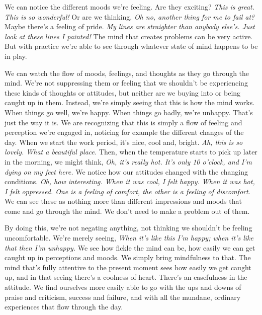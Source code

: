 We can notice the different moods we're feeling. Are they exciting? 
\emph{This is great. This is so wonderful!} Or are we thinking, 
\emph{Oh no, another thing for me to fail at?} Maybe there's a feeling 
of pride. \emph{My lines are straighter than anybody else's. Just look 
at these lines I painted!} The mind that creates problems can be very 
active. But with practice we're able to see through whatever state of 
mind happens to be in play.

We can watch the flow of moods, feelings, and thoughts as they go 
through the mind. We're not suppressing them or feeling that we 
shouldn't be experiencing these kinds of thoughts or attitudes, but 
neither are we buying into or being caught up in them. Instead, we're 
simply seeing that this is how the mind works. When things go well, 
we're happy. When things go badly, we're unhappy. That's just the way 
it is. We are recognizing that this is simply a flow of feeling and 
perception we're engaged in, noticing for example the different changes 
of the day. When we start the work period, it's nice, cool and, bright. 
\emph{Ah, this is so lovely. What a beautiful place.} Then, when the 
temperature starts to pick up later in the morning, we might think, 
\emph{Oh, it's really hot. It's only 10 o'clock, and I'm dying on my 
feet here.} We notice how our attitudes changed with the changing 
conditions. \emph{Oh, how interesting. When it was cool, I felt happy. 
When it was hot, I felt oppressed. One is a feeling of comfort, the 
other is a feeling of discomfort.} We can see these as nothing more 
than different impressions and moods that come and go through the mind. 
We don't need to make a problem out of them.

By doing this, we're not negating anything, not thinking we shouldn't 
be feeling uncomfortable. We're merely seeing, \emph{When it's like 
this I'm happy; when it's like that then I'm unhappy.} We see how 
fickle the mind can be, how easily we can get caught up in perceptions 
and moods. We simply bring mindfulness to that. The mind that's fully 
attentive to the present moment sees how easily we get caught up, and 
in that seeing there's a coolness of heart. There's an easefulness in 
the attitude. We find ourselves more easily able to go with the ups and 
downs of praise and criticism, success and failure, and with all the 
mundane, ordinary experiences that flow through the day.

